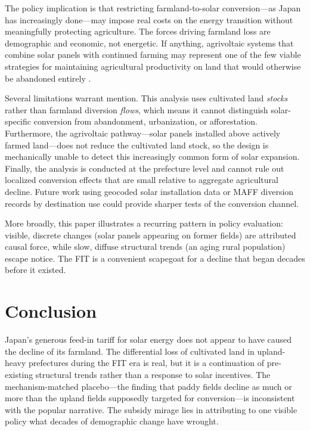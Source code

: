 \documentclass[12pt]{article}
\begin{document}
The policy implication is that restricting farmland-to-solar conversion---as Japan has increasingly done---may impose real costs on the energy transition without meaningfully protecting agriculture. The forces driving farmland loss are demographic and economic, not energetic. If anything, agrivoltaic systems that combine solar panels with continued farming may represent one of the few viable strategies for maintaining agricultural productivity on land that would otherwise be abandoned entirely \citep{Letchumanan2022, Taghizadeh2019}.

Several limitations warrant mention. This analysis uses cultivated land \textit{stocks} rather than farmland diversion \textit{flows}, which means it cannot distinguish solar-specific conversion from abandonment, urbanization, or afforestation. Furthermore, the agrivoltaic pathway---solar panels installed above actively farmed land---does not reduce the cultivated land stock, so the design is mechanically unable to detect this increasingly common form of solar expansion. Finally, the analysis is conducted at the prefecture level and cannot rule out localized conversion effects that are small relative to aggregate agricultural decline. Future work using geocoded solar installation data or MAFF diversion records by destination use could provide sharper tests of the conversion channel.

More broadly, this paper illustrates a recurring pattern in policy evaluation: visible, discrete changes (solar panels appearing on former fields) are attributed causal force, while slow, diffuse structural trends (an aging rural population) escape notice. The FIT is a convenient scapegoat for a decline that began decades before it existed.


\section{Conclusion}

Japan's generous feed-in tariff for solar energy does not appear to have caused the decline of its farmland. The differential loss of cultivated land in upland-heavy prefectures during the FIT era is real, but it is a continuation of pre-existing structural trends rather than a response to solar incentives. The mechanism-matched placebo---the finding that paddy fields decline as much or more than the upland fields supposedly targeted for conversion---is inconsistent with the popular narrative. The subsidy mirage lies in attributing to one visible policy what decades of demographic change have wrought.
\end{document}

